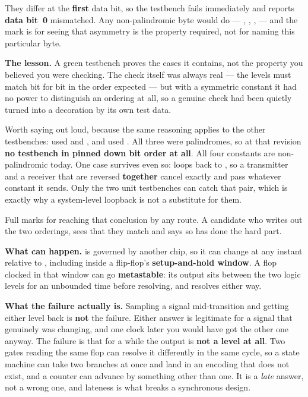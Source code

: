 They differ at the \textbf{first} data bit, so the testbench fails immediately and reports
\textbf{data bit~0} mismatched. Any non-palindromic byte would do --- , ,
,  --- and the mark is for seeing that asymmetry is the property required, not
for naming this particular byte.

\textbf{The lesson.} A green testbench proves the cases it contains, not the property you believed
you were checking. The check itself was always real --- the levels must match  bit for
bit in the order expected --- but with a symmetric constant it had no power to distinguish an
ordering at all, so a genuine check had been quietly turned into a decoration by its own test data.

Worth saying out loud, because the same reasoning applies to the other testbenches:
 used  and , and  used . All
three were palindromes, so at that revision \textbf{no testbench in  pinned down bit order
at all}. All four constants are non-palindromic today. One case survives even so:
 loops  back to , so a transmitter and a receiver that are
reversed \textbf{together} cancel exactly and pass whatever constant it sends. Only the two unit
testbenches can catch that pair, which is exactly why a system-level loopback is not a substitute for
them.

Full marks for reaching that conclusion by any route. A candidate who writes out the two orderings,
sees that they match and says so has done the hard part.


\textbf{What can happen.}  is governed by another chip, so it can change at any instant
relative to , including inside a flip-flop's \textbf{setup-and-hold window}. A flop
clocked in that window can go \textbf{metastable}: its output sits between the two logic levels for
an unbounded time before resolving, and resolves either way.

\textbf{What the failure actually is.} Sampling a signal mid-transition and getting either level
back is \textbf{not} the failure. Either answer is legitimate for a signal that genuinely was
changing, and one clock later you would have got the other one anyway. The failure is that for a
while the output is \textbf{not a level at all}. Two gates reading the same flop can resolve it
differently in the same cycle, so a state machine can take two branches at once and land in an
encoding that does not exist, and a counter can advance by something other than one. It is a
\emph{late} answer, not a wrong one, and lateness is what breaks a synchronous design. 

